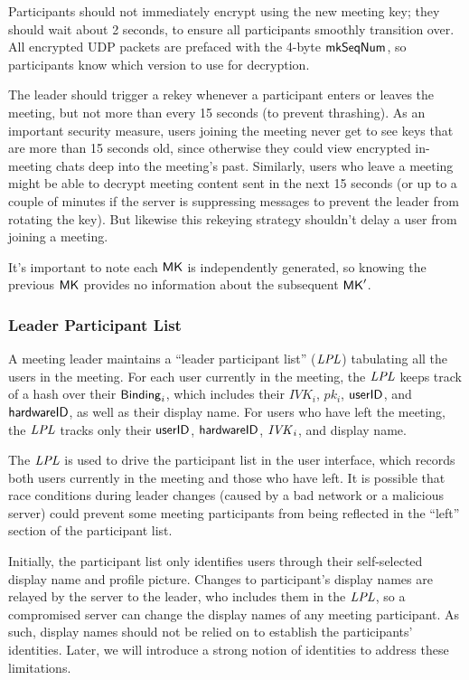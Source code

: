 Participants should not immediately encrypt using the new meeting key; they should wait about 2
seconds, to ensure all participants smoothly transition over. All encrypted UDP packets are prefaced
with the 4-byte $\mathsf{mkSeqNum}$, so participants know which version to use for decryption. 

The leader should trigger a rekey whenever a participant enters or leaves the meeting, but not more
than every 15 seconds (to prevent thrashing). As an important security measure, users joining the
meeting never get to see keys that are more than 15 seconds old, since otherwise they could view
encrypted in-meeting chats deep into the meeting's past. Similarly, users who leave a meeting might
be able to decrypt meeting content sent in the next 15 seconds (or up to a couple of minutes if the
server is suppressing messages to prevent the leader from rotating the key). But likewise this
rekeying strategy shouldn't delay a user from joining a meeting.

It's important to note each ${\sf MK}$ is independently generated, so knowing the previous ${\sf MK}$ provides
no information about the subsequent ${\sf MK}'$.


\subsubsection{Leader Participant List}\label{subsubsec:lpl} A meeting leader maintains a ``leader
participant list'' ($\mathit{LPL}$) tabulating all the users in the meeting. For each user currently in the
meeting, the $\mathit{LPL}$ keeps track of a hash over their ${\sf Binding}_i$, which includes their $IVK_i$,
$pk_i$, $\mathsf{userID}$, and ${\sf hardwareID}$, as well as their display name. For users who have left the
meeting, the $\mathit{LPL}$ tracks only their $\mathsf{userID}$, ${\sf hardwareID}$, $\mathit{IVK}_i$, and display name.

The $\mathit{LPL}$ is used to drive the participant list in the user interface, which records both users
currently in the meeting and those who have left. It is possible that race conditions during leader
changes (caused by a bad network or a malicious server) could prevent some meeting participants from
being reflected in the ``left'' section of the participant list.

Initially, the participant list only identifies users through their self-selected display name and
profile picture. Changes to participant's display names are relayed by the server to the leader, who
includes them in the $\mathit{LPL}$, so a compromised server can change the display names of any meeting
participant. As such, display names should not be relied on to establish the participants'
identities. Later, we will introduce a strong notion of identities to address these limitations.

